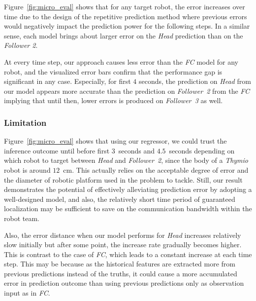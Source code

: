 \documentclass[letterpaper, 10 pt, conference]{ieeeconf}  %
\begin{document}
	Figure~\ref{fig:micro_eval} shows that for any target robot, the error increases over time due to the
	design of the repetitive prediction method where previous errors would negatively
	impact the prediction power for the following steps. In a similar sense, each model
	brings about larger error on the \emph{Head} prediction than on the \emph{Follower 2}.

	At every time step, our approach causes less error than the \emph{FC} model for any robot, and
    the visualized error bars confirm that the performance gap is significant in any case.
    Especially, for first $4$ seconds, the prediction on \emph{Head} from our model appears
    more accurate than the prediction on \emph{Follower~2} from the \emph{FC} implying that
    until then, lower errors is produced on \emph{Follower~3} as well.

    \subsubsection{Limitation}
	\label{sec:limitation}

	Figure~\ref{fig:micro_eval} shows that using our regressor, we could trust the inference
	outcome until before first $3$~seconds and $4.5$~seconds depending on which robot to target between
	\emph{Head} and \emph{Follower~2}, since the body of a \emph{Thymio} robot is around
	$12$~cm. This actually relies on the acceptable degree of error and the diameter of
	robotic platform used in the problem to tackle. Still, our result demonstrates the potential
	of effectively alleviating prediction error by adopting a well-designed model, and also,
	the relatively short time period of guaranteed localization may be sufficient to
	save on the communication bandwidth within the robot team.

	Also, the error distance when our model performs for \emph{Head} increases relatively slow
	initially but after some point, the increase rate gradually becomes higher. This is contrast to the
	case of \emph{FC}, which leads to a constant increase at each time step.
	This may be because as the historical features are extracted more from previous predictions
	instead of the truths, it could cause a more accumulated error in prediction outcome than
	using previous predictions only as observation input as in \emph{FC}.
\end{document}
